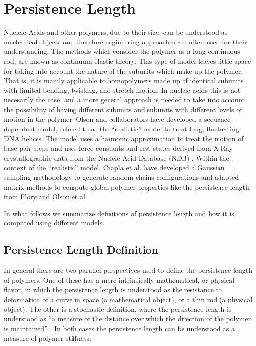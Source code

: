 \chapter{Persistence Length}
\label{appendix4a}

Nucleic Acids and other polymers, due to their size, can be understood
as  mechanical  objects  \cite{marko2003,  nelson2004}  and  therefore
engineering approaches  are often  used for their  understanding.  The
methods which consider the polymer as a long continuous rod, are known
as continuum elastic  theory.  This type of model  leaves little space
for taking into  account the nature of the subunits  which make up the
polymer. That is,  it is mainly applicable to  homopolymers made up of
identical  subunits  with   limited  bending,  twisting,  and  stretch
motion. In nucleic  acids this is not necesarily the  case, and a more
general approach  is needed  to take into  account the  possibility of
having different subunits and subunits with different levels of motion
in   the  polymer.    Olson   and  collaborators   have  developed   a
sequence-dependent  model,  refered  to  as  the  ``realistic''  model
\cite{olson1993}  to treat  long, fluctuating  DNA helices.  The model
uses a harmonic  approximation to treat the motion  of base-pair steps
and  uses   force-constants  and   rest  states  derived   from  X-Ray
crystallographic   data   from  the   Nucleic   Acid  Database   (NDB)
\cite{go1976,  olson1998}.  Within  the context  of  the ``realistic''
model,  Czapla et  al.   \cite{czapla2006} have  developed a  Gaussian
sampling  methodology  to generate  random  chains configurations  and
adapted matrix  methods to compute global polymer  properties like the
persistence   length  from   Flory  \cite{flory1969}   and   Olson  et
al. \cite{maroun1988a, marky1994a}

In what follows we summarize definitions of persistence length and how
it is computed using different models.

\section{Persistence Length Definition}
In  general there  are two  parallel perspectives  used to  define the
persistence length of polymers. One  of these has a more intrinsically
mathematical, or  physical flavor, in which the  persistence length is
understood as  the resistance  to deformation of  a curve in  space (a
mathematical object), or a thin rod (a physical object).  The other is
a stochastic definition, where the persistence length is understood as
``a measure of the distance over which the direction of the polymer is
maintained'' \cite{kratky1949}.  In  both cases the persistence length
can be understood as a measure of polymer stiffness.

